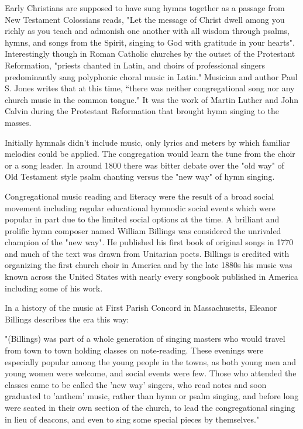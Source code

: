 \documentclass[12pt]{article}
\begin{document}
Early Christians are supposed to have sung hymns together as a passage from New Testament Colossians reads, "Let the message of Christ dwell among you richly as you teach and admonish one another with all wisdom through psalms, hymns, and songs from the Spirit, singing to God with gratitude in your hearts". Interestingly though in Roman Catholic churches by the outset of the Protestant Reformation, "priests chanted in Latin, and choirs of professional singers predominantly sang polyphonic choral music in Latin." Musician and author Paul S. Jones writes that at this time, “there was neither congregational song nor any church music in the common tongue." It was the work of Martin Luther and John Calvin during the Protestant Reformation that brought hymn singing to the masses.

Initially hymnals didn't include music, only lyrics and meters by which familiar melodies could be applied. The congregation would learn the tune from the choir or a song leader. In around 1800 there was bitter debate over the "old way" of Old Testament style psalm chanting versus the "new way" of hymn singing.

Congregational music reading and literacy were the result of a broad social movement including regular educational hymnodic social events which were popular in part due to the limited social options at the time. A brilliant and prolific hymn composer named William Billings was considered the unrivaled champion of the "new way". He published his first book of original songs in 1770 and much of the text was drawn from Unitarian poets. Billings is credited with organizing the first church choir in America and by the late 1880s his music was known across the United States with nearly every songbook published in America including some of his work.

In a history of the music at First Parish Concord in Massachusetts, Eleanor Billings describes the era this way:

"(Billings) was part of a whole generation of singing masters who would travel from town to town holding classes on note-reading. These evenings were especially popular among the young people in the towns, as both young men and young women were welcome, and social events were few. Those who attended the classes came to be called the 'new way' singers, who read notes and soon graduated to 'anthem' music, rather than hymn or psalm singing, and before long were seated in their own section of the church, to lead the congregational singing in lieu of deacons, and even to sing some special pieces by themselves."
\end{document}

